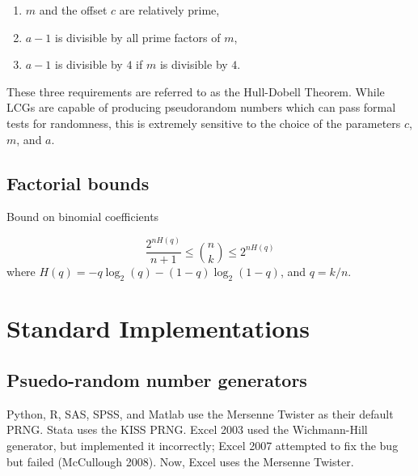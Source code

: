 \documentclass[12pt]{article}
\begin{document}
\begin{enumerate}
\item $m$ and the offset $c$ are relatively prime,
\item $a-1$ is divisible by all prime factors of $m$,
\item $a-1$ is divisible by $4$ if $m$ is divisible by $4$.
\end{enumerate}

These three requirements are referred to as the Hull-Dobell Theorem.
While LCGs are capable of producing pseudorandom numbers which can pass formal tests for randomness, this is extremely sensitive to the choice of the parameters $c$, $m$, and $a$.

\subsection{Factorial bounds}

Bound on binomial coefficients

$$ \frac{2^{nH(q)}}{n+1} \leq {n \choose k} \leq 2^{nH(q)}$$
where $H(q) = -q \log_2(q) - (1-q)\log_2(1-q)$, and $q = k/n$.


\section{Standard Implementations}
\subsection{Psuedo-random number generators}
Python, R, SAS, SPSS, and Matlab use the Mersenne Twister as their default PRNG.
Stata uses the KISS PRNG.
Excel 2003 used the Wichmann-Hill generator, but implemented it incorrectly; Excel 2007 attempted to fix the bug but failed (McCullough 2008).
Now, Excel uses the Mersenne Twister.
\end{document}
